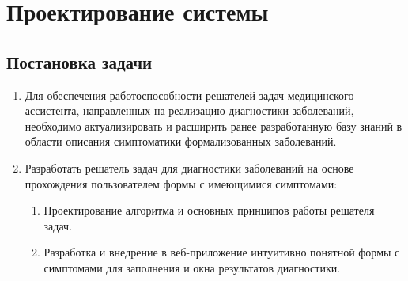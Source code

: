 \section{Проектирование системы}
\label{sec:designing}

\subsection{Постановка задачи}
\begin{enumerate}[label=\arabic*)]
    \item Для обеспечения работоспособности решателей задач медицинского ассистента, направленных на реализацию диагностики заболеваний, необходимо актуализировать и расширить ранее разработанную базу знаний в области описания симптоматики формализованных заболеваний.
    \item Разработать решатель задач для диагностики заболеваний на основе прохождения пользователем формы с имеющимися симптомами:
    \begin{enumerate}[label=\alph*)]
        \item Проектирование алгоритма и основных принципов работы решателя задач.
        \item Разработка и внедрение в веб-приложение интуитивно понятной формы с симптомами для заполнения и окна результатов диагностики.
    \end{enumerate}


\end{enumerate}
